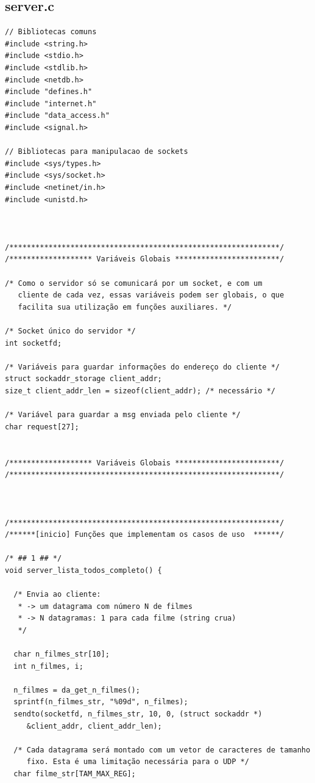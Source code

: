 \documentclass[11pt,twoside]{article}
\begin{document}
\subsection{server.c}
\begin{verbatim}
// Bibliotecas comuns
#include <string.h>
#include <stdio.h>
#include <stdlib.h>
#include <netdb.h>
#include "defines.h"
#include "internet.h"
#include "data_access.h"
#include <signal.h>

// Bibliotecas para manipulacao de sockets
#include <sys/types.h>
#include <sys/socket.h>
#include <netinet/in.h>
#include <unistd.h>



/**************************************************************/
/******************* Variáveis Globais ************************/

/* Como o servidor só se comunicará por um socket, e com um 
   cliente de cada vez, essas variáveis podem ser globais, o que
   facilita sua utilização em funções auxiliares. */

/* Socket único do servidor */
int socketfd;

/* Variáveis para guardar informações do endereço do cliente */
struct sockaddr_storage client_addr;
size_t client_addr_len = sizeof(client_addr); /* necessário */

/* Variável para guardar a msg enviada pelo cliente */
char request[27];


/******************* Variáveis Globais ************************/
/**************************************************************/



/**************************************************************/
/******[inicio] Funções que implementam os casos de uso  ******/

/* ## 1 ## */
void server_lista_todos_completo() {
  
  /* Envia ao cliente:
   * -> um datagrama com número N de filmes
   * -> N datagramas: 1 para cada filme (string crua)
   */
  
  char n_filmes_str[10];
  int n_filmes, i;

  n_filmes = da_get_n_filmes();
  sprintf(n_filmes_str, "%09d", n_filmes);
  sendto(socketfd, n_filmes_str, 10, 0, (struct sockaddr *)
	 &client_addr, client_addr_len);
	
  /* Cada datagrama será montado com um vetor de caracteres de tamanho
     fixo. Esta é uma limitação necessária para o UDP */  
  char filme_str[TAM_MAX_REG];


\end{verbatim}
\end{document}
